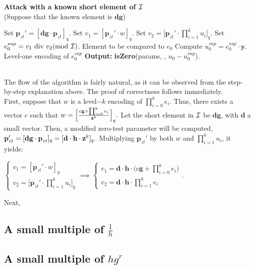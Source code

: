 \begin{tcolorbox}[colframe=black,colback=white,arc=0pt,outer arc=0pt]
	\begin{center}
		\textbf{Attack with a known short element of $\mathcal{I}$}\\
		(Suppose that the known element is $\textbf{dg}$)
	\end{center}
	\begin{algorithmic}[1]
		\State Set $\textbf{p}_{zt}' = [\textbf{dg} \cdot \textbf{p}_{zt}]_q$.
		\Statex
		\State Set $v_1 = [\textbf{p}_{zt}' \cdot w]_q$.
		\Statex
		\State Set $v_2 = \Bigg[ \textbf{p}_{zt}' \cdot \displaystyle{\prod_{i = 1}^{k} u_i} \Bigg]_q$.
		\Statex
		\State Set $e^{sup}_0 = v_1 \text{ div } v_2 (\text{mod } \mathcal{I})$. \Comment Element to be compared to $e_0$
		\Statex
		\State Compute $u_0^{sup} = e_0^{sup} \cdot \textbf{y}$.	 \Comment Level-one encoding of $e_0^{sup}$
		\Statex
		\State \textbf{Output:} \textbf{isZero}(params, \pzt, $u_0 - u_0^{sup}$). 
	\end{algorithmic}
\end{tcolorbox}
~\\

The flow of the algorithm is fairly natural, as it can be observed from the step-by-step explanation above. The proof of correctness follows immediately. \\

First, suppose that $w$ is a level$-k$ encoding of $\displaystyle{\prod_{i = 0}^{k} e_i}$. Thus, there exists a vector $c$ such that $w = \Big[ \frac{c \textbf{g} + \prod_{i = 0}^{k} e_i}{\textbf{z}^k} \Big]_q.$ Let the short element in $\mathcal{I}$ be $\textbf{dg}$, with $\textbf{d}$ a small vector. Then, a modified zero-test parameter will be computed, $\textbf{p}_{zt}' = [\textbf{dg} \cdot \textbf{p}_{zt}]_q = [\textbf{d} \cdot \textbf{h} \cdot \textbf{z}^k]_q$. Multiplying $\textbf{p}_{zt}'$ by both $w$ and $\displaystyle{\prod_{i = 1}^{k} u_i}$, it yields:

\begin{center}
	$
	\begin{cases}
			v_1 = [\textbf{p}_{zt}' \cdot w]_q \\
			 v_2 = \bigg[ \textbf{p}_{zt}' \cdot \displaystyle{\prod_{i = 1}^{k} u_i} \bigg]_q
	\end{cases}
	 \implies 
		\begin{cases}
	v_1 = \textbf{d} \cdot \textbf{h} \cdot \bigg( c\textbf{g} + \displaystyle{\prod_{i = 0}^{k} e_i} \bigg) \\
	v_2 = \textbf{d} \cdot \textbf{h} \cdot \displaystyle{\prod_{i = 1}^{k} e_i}
	\end{cases}.
	$
	
\end{center}

Next, 


\subsection{A small multiple of $\frac{1}{h}$}

\subsection{A small multiple of $hg^r$}
